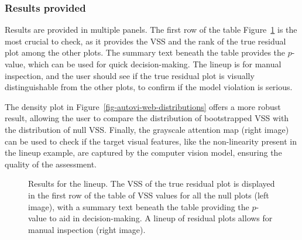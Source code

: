 \documentclass[
doublespace,
  times]{anzsauth}
\begin{document}
\subsubsection{Results provided}\label{results-provided}

Results are provided in multiple panels. The first row of the table
Figure~\ref{fig-autovi-web-lineup} is the most crucial to check, as it
provides the VSS and the rank of the true residual plot among the other
plots. The summary text beneath the table provides the \(p\)-value,
which can be used for quick decision-making. The lineup is for manual
inspection, and the user should see if the true residual plot is
visually distinguishable from the other plots, to confirm if the model
violation is serious.

The density plot in Figure~\ref{fig-autovi-web-distributions} offers a
more robust result, allowing the user to compare the distribution of
bootstrapped VSS with the distribution of null VSS. Finally, the
grayscale attention map (right image) can be used to check if the target
visual features, like the non-linearity present in the lineup example,
are captured by the computer vision model, ensuring the quality of the
assessment.

\begin{figure}


\caption{\label{fig-autovi-web-lineup}Results for the lineup. The VSS of
the true residual plot is displayed in the first row of the table of VSS
values for all the null plots (left image), with a summary text beneath
the table providing the \(p\)-value to aid in decision-making. A lineup
of residual plots allows for manual inspection (right image).}

\end{figure}%
\end{document}
